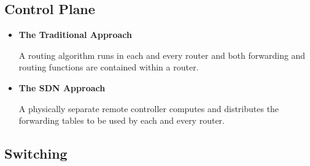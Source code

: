 \documentclass[11pt]{article}
\begin{document}
\subsection{Control Plane}

\begin{itemize}
	\item \textbf{The Traditional Approach}
	
	A routing algorithm runs in each and every router and both forwarding and routing functions are contained within a router. 
	
	\item \textbf{The SDN Approach}
	
	A physically separate remote controller computes and distributes the forwarding tables to be used by each and every router.
	
\end{itemize}

\subsection{Switching}
\end{document}

